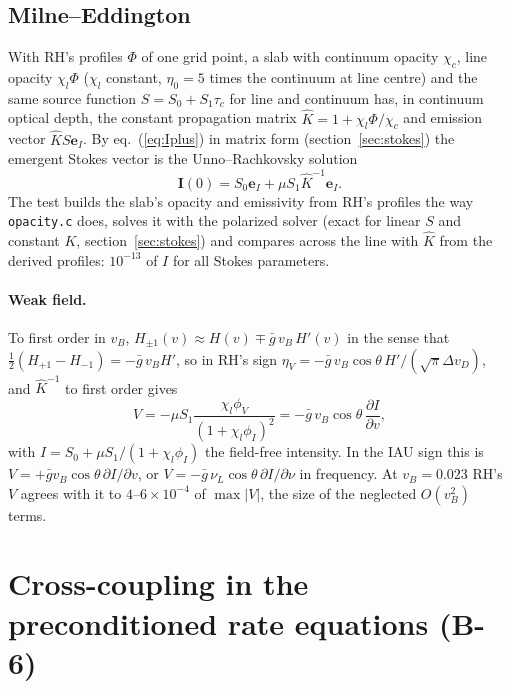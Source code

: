 \documentclass[11pt,a4paper]{article}
\newcommand{\code}[1]{\texttt{#1}}
\newcommand{\vI}{\boldsymbol{I}}
\begin{document}
\subsection{Milne--Eddington}
With RH's profiles $\Phi$ of one grid point, a slab with continuum
opacity $\chi_c$, line opacity $\chi_l\Phi$ ($\chi_l$ constant,
$\eta_0 = 5$ times the continuum at line centre) and the same source
function $S = S_0+S_1\tau_c$ for line and continuum has, in continuum
optical depth, the constant propagation matrix $\hat K = 1+\chi_l\Phi/\chi_c$
and emission vector $\hat KS\boldsymbol e_I$. By
eq.~(\ref{eq:Iplus}) in matrix form (section~\ref{sec:stokes}) the
emergent Stokes vector is the Unno--Rachkovsky solution
\begin{equation}
\vI(0) = S_0\boldsymbol e_I+\mu S_1\hat K^{-1}\boldsymbol e_I .
\end{equation}
The test builds the slab's opacity and emissivity from RH's profiles the
way \code{opacity.c} does, solves it with the polarized solver (exact for
linear $S$ and constant $K$, section~\ref{sec:stokes}) and compares across
the line with $\hat K$ from the derived profiles: $10^{-13}$ of $I$ for
all Stokes parameters.

\paragraph{Weak field.} To first order in $v_B$,
$H_{\pm1}(v)\approx H(v)\mp\bar g\,v_B\,H'(v)$ in the sense that
$\tfrac12(H_{+1}-H_{-1}) = -\bar g\,v_B H'$, so in RH's sign
$\eta_V = -\bar g\,v_B\cos\theta\,H'/(\sqrt\pi\Delta v_D)$, and
$\hat K^{-1}$ to first order gives
\begin{equation}
V = -\mu S_1\frac{\chi_l\phi_V}{(1+\chi_l\phi_I)^2}
  = -\bar g\,v_B\cos\theta\,\frac{\partial I}{\partial v},
\end{equation}
with $I = S_0+\mu S_1/(1+\chi_l\phi_I)$ the field-free intensity. In
the IAU sign this is $V = +\bar g v_B\cos\theta\,\partial I/\partial v$,
or $V = -\bar g\,\nu_L\cos\theta\,\partial I/\partial\nu$ in frequency.
At $v_B = 0.023$ RH's $V$ agrees with it to $4$--$6\times10^{-4}$ of
$\max|V|$, the size of the neglected $O(v_B^2)$ terms.

\section{Cross-coupling in the preconditioned rate equations (B-6)}
\label{sec:coupling}
\end{document}
